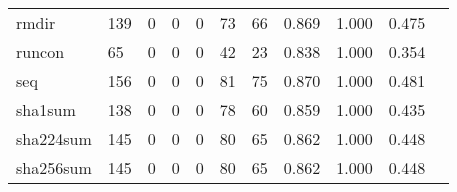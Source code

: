 \begin{longtable}{lp{1.2cm}p{1.2cm}p{1.2cm}p{1.2cm}p{1.2cm}p{1.2cm}p{1.2cm}p{1.2cm}p{1.2cm}p{1.2cm}}
rmdir     &                                   139 &                                                  0 &                                                  0 &                                                  0 &                                                 73 &                                                 66 &                                              0.869 &                                              1.000 &                                              0.475 \\
runcon    &                                    65 &                                                  0 &                                                  0 &                                                  0 &                                                 42 &                                                 23 &                                              0.838 &                                              1.000 &                                              0.354 \\
seq       &                                   156 &                                                  0 &                                                  0 &                                                  0 &                                                 81 &                                                 75 &                                              0.870 &                                              1.000 &                                              0.481 \\
sha1sum   &                                   138 &                                                  0 &                                                  0 &                                                  0 &                                                 78 &                                                 60 &                                              0.859 &                                              1.000 &                                              0.435 \\
sha224sum &                                   145 &                                                  0 &                                                  0 &                                                  0 &                                                 80 &                                                 65 &                                              0.862 &                                              1.000 &                                              0.448 \\
sha256sum &                                   145 &                                                  0 &                                                  0 &                                                  0 &                                                 80 &                                                 65 &                                              0.862 &                                              1.000 &                                              0.448 \\

\end{longtable}
